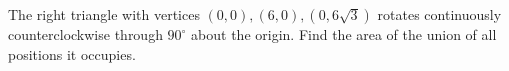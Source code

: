 The right triangle with vertices $(0,0),(6,0),(0,6\sqrt3)$ rotates continuously counterclockwise through $90^\circ$ about the origin. Find the area of the union of all positions it occupies.
